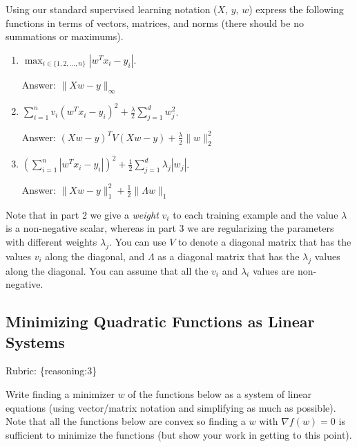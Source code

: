 \documentclass{article}
\def\rubric#1{\gre{Rubric: \{#1\}}}{}
\def\ans#1{\par\gre{Answer: #1}}
\def\blu#1{{\color{blu}#1}}
\def\gre#1{{\color{gre}#1}}
\def\red#1{{\color{red}#1}}
\def\half{\frac 1 2}
\def\enum#1{\begin{enumerate}#1\end{enumerate}}
\begin{document}
Using our standard supervised learning notation ($X$, $y$, $w$)
express the following functions in terms of vectors, matrices, and norms (there should be no summations or maximums).
\blu{\enum{
\item $\max_{i \in \{1,2,\dots,n\}}  |w^Tx_i - y_i|$.
\ans{$\|Xw-y\|_{\infty}$}
\item $\sum_{i=1}^n v_i(w^Tx_i  - y_i)^2 + \frac{\lambda}{2}\sum_{j=1}^d w_j^2$.
\ans{$(Xw-y)^TV(Xw-y)+\frac{\lambda}{2}\|w\|_2^2$}
\item $\left(\sum_{i=1}^n |w^Tx_i - y_i|\right)^2 +  \half\sum_{j=1}^{d} \lambda_j|w_j|$.
\ans{$\|Xw-y\|^2_1+\frac{1}{2}\|\Lambda w\|_1$}
}}
Note that in part 2 we give a \emph{weight} $v_i$ to each training example \red{and the value $\lambda$ is a non-negative scalar}, whereas in part 3 we are regularizing the parameters with different weights $\lambda_j$.
You can use $V$ to denote a diagonal matrix that has the values $v_i$ along the diagonal, and $\Lambda$ as a diagonal matrix that has the $\lambda_j$ values along the diagonal. You can assume that all the $v_i$ and $\lambda_i$ values are non-negative. 

\subsection{Minimizing Quadratic Functions as Linear Systems}
\rubric{reasoning:3}

Write finding a minimizer $w$ of the functions below as a system of linear equations (using vector/matrix notation and simplifying as much as possible). Note that all the functions below are convex  so finding a $w$ with $\nabla f(w) = 0$ is sufficient to minimize the functions (but show your work in getting to this point).
\end{document}
